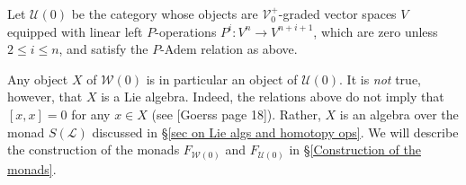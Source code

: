 \documentclass[11pt]{amsart}
\theoremstyle{plain}
\theoremstyle{definition}
\renewcommand{\to}{\longrightarrow}
\newcommand{\scrL}{\mathscr{L}}
\newcommand{\calW}{\mathcal{W}}
\newcommand{\calU}{\mathcal{U}}
\newcommand{\calV}{\mathcal{V}}
\theoremstyle{plain}
\newcommand{\LieOperad}{{\scrL}}
\newcommand{\vect}[2]{\calV^{#1}_{#2}}
\begin{document}
\begin{Conventions and notation}
Let $\calU(0)$ be the category whose objects are $\vect{+}{0}$-graded vector spaces $V$ equipped with linear left $P$-operations $P^i:V^n\to V^{n+i+1}$, which are zero unless  $2\leq i\leq n$, and satisfy the $P$-Adem relation as above.

Any object $X$ of $\calW(0)$ is in particular an object of $\calU(0)$. It is \emph{not} true, however, that $X$ is a Lie algebra. Indeed, the relations above do not imply that $[x,x]=0$ for any $x\in X$ (see [Goerss page 18]). Rather, $X$ is an algebra over the monad $S(\LieOperad)$ discussed in \S\ref{sec on Lie algs and homotopy ops}. We will describe the construction of the monads $F_{\calW(0)}$ and $F_{\calU(0)}$ in \S\ref{Construction of the monads}.



\end{Conventions and notation}
\end{document}

